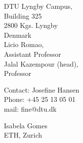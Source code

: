 \documentclass[10pt]{extarticle}
\begin{document}
    \begin{center}
        \begin{minipage}[t]{0.19\textwidth}
            \begin{flushleft}
                DTU Lyngby Campus, \\
                Building 325 \\
                2800 Kgs. Lyngby \\
                Denmark \\

                \vspace{0.5cm}
                Licio Romao, \\
                Assistant Professor \\
                \vspace{0.5cm}
                Jalal Kazempour (head), \\ 
                Professor

                \vspace{0.5cm}
                Contact: Josefine Hansen \\
                Phone: +45 25 13 05 01 \\
                mail: fine@dtu.dk 

                \vspace{2.5cm}
                Isabela Gomes\\
                ETH, Zurich \\
            


\end{flushleft}
\end{minipage}
\end{center}
\end{document}
